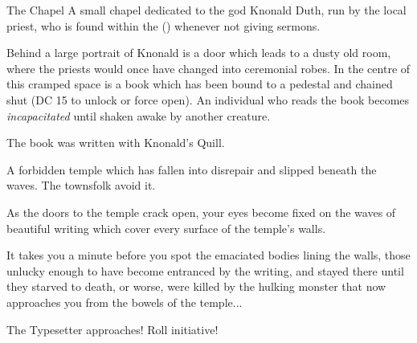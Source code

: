 \begin{RpgMap}[prefix={}]
	\begin{RpgArea}{The Chapel}
		A small chapel dedicated to the god Knonald Duth, run by the local priest, who is found within the  () whenever not giving sermons.
		\begin{RpgSecret*}{}
			 Behind a large portrait of Knonald is a door which leads to a dusty old room, where the priests would once have changed into ceremonial robes.
			 In the centre of this cramped space is a book which has been bound to a pedestal and chained shut (DC 15 to unlock or force open). An individual who reads the book becomes \textit{incapacitated} until shaken awake by another creature.

			The book was written with Knonald's Quill.
		\end{RpgSecret*}

	\end{RpgArea}
	 A forbidden temple which has fallen into disrepair and slipped beneath the waves. The townsfolk avoid it.

	\begin{RpgSecret*}
		\begin{RpgNarration}
			As the doors to the temple crack open, your eyes become fixed on the waves of beautiful writing which cover every surface of the temple's walls.

			It takes you a minute before you spot the emaciated bodies lining the walls, those unlucky enough to have become entranced by the writing, and stayed there until they starved to death, or worse, were killed by the hulking monster that now approaches you from the bowels of the temple...
		\end{RpgNarration}

		The Typesetter approaches! Roll initiative!
	\end{RpgSecret*}
\end{RpgMap}
